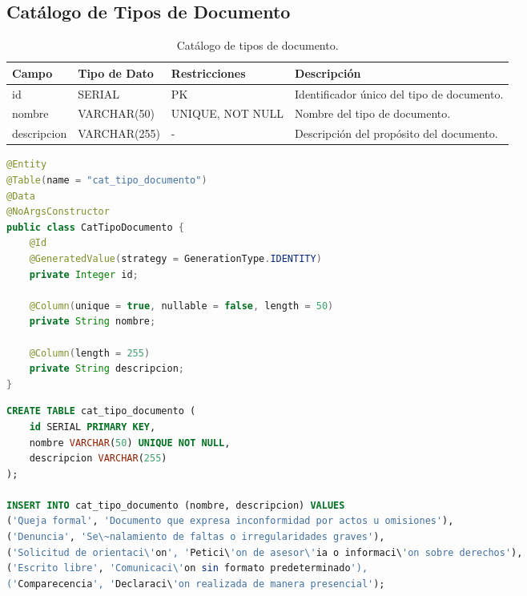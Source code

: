 \subsection{Cat\'alogo de Tipos de Documento}

\begin{table}[H]
\centering
\small
\begin{tabularx}{\textwidth}{|l|l|l|X|}
\hline
\rowcolor{azulESCOM} 
\color{white}\textbf{Campo} & \color{white}\textbf{Tipo de Dato} & \color{white}\textbf{Restricciones} & \color{white}\textbf{Descripci\'on} \\ \hline
id & SERIAL & PK & Identificador \'unico del tipo de documento. \\ \hline
nombre & VARCHAR(50) & UNIQUE, NOT NULL & Nombre del tipo de documento. \\ \hline
descripcion & VARCHAR(255) & - & Descripci\'on del prop\'osito del documento. \\ \hline
\end{tabularx}
\caption{Cat\'alogo de tipos de documento.}
\label{tab:dict_cat_tipo_doc}
\end{table}

\begin{lstlisting}[language=Java, caption={Entidad Java para cat\'alogo de tipos de documento.}, label={lst:java_cat_tipo_doc}]
@Entity
@Table(name = "cat_tipo_documento")
@Data
@NoArgsConstructor
public class CatTipoDocumento {
    @Id
    @GeneratedValue(strategy = GenerationType.IDENTITY)
    private Integer id;
    
    @Column(unique = true, nullable = false, length = 50)
    private String nombre;
    
    @Column(length = 255)
    private String descripcion;
}
\end{lstlisting}

\begin{lstlisting}[language=SQL, caption={Script de creaci\'on e inicializaci\'on del cat\'alogo de tipos de documento.}, label={lst:sql_cat_tipo_doc}]
CREATE TABLE cat_tipo_documento (
    id SERIAL PRIMARY KEY,
    nombre VARCHAR(50) UNIQUE NOT NULL,
    descripcion VARCHAR(255)
);

INSERT INTO cat_tipo_documento (nombre, descripcion) VALUES 
('Queja formal', 'Documento que expresa inconformidad por actos u omisiones'),
('Denuncia', 'Se\~nalamiento de faltas o irregularidades graves'),
('Solicitud de orientaci\'on', 'Petici\'on de asesor\'ia o informaci\'on sobre derechos'),
('Escrito libre', 'Comunicaci\'on sin formato predeterminado'),
('Comparecencia', 'Declaraci\'on realizada de manera presencial');
\end{lstlisting}

